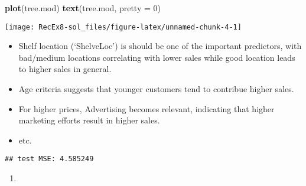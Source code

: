 \documentclass[
]{article}
\newenvironment{Shaded}{\begin{snugshade}}{\end{snugshade}}
\newcommand{\AttributeTok}[1]{\textcolor[rgb]{0.13,0.29,0.53}{#1}}
\newcommand{\DecValTok}[1]{\textcolor[rgb]{0.00,0.00,0.81}{#1}}
\newcommand{\FunctionTok}[1]{\textcolor[rgb]{0.13,0.29,0.53}{\textbf{#1}}}
\newcommand{\NormalTok}[1]{#1}
\newcommand{\OtherTok}[1]{\textcolor[rgb]{0.56,0.35,0.01}{#1}}
\newcommand{\SpecialCharTok}[1]{\textcolor[rgb]{0.81,0.36,0.00}{\textbf{#1}}}
\newcommand{\StringTok}[1]{\textcolor[rgb]{0.31,0.60,0.02}{#1}}
\providecommand{\tightlist}{%
  \setlength{\itemsep}{0pt}\setlength{\parskip}{0pt}}
\begin{document}
\begin{Shaded}
\begin{Highlighting}[]
\FunctionTok{plot}\NormalTok{(tree.mod)}
\FunctionTok{text}\NormalTok{(tree.mod, }\AttributeTok{pretty =} \DecValTok{0}\NormalTok{)}
\end{Highlighting}
\end{Shaded}

\texttt{[image: RecEx8-sol\_files/figure-latex/unnamed-chunk-4-1]}

\begin{itemize}
\tightlist
\item
  Shelf location (`ShelveLoc') is should be one of the important
  predictors, with bad/medium locations correlating with lower sales
  while good location leads to higher sales in general.
\item
  Age criteria suggests that younger customers tend to contribue higher
  sales.
\item
  For higher prices, Advertising becomes relevant, indicating that
  higher marketing efforts result in higher sales.
\item
  etc.
\end{itemize}

\begin{Shaded}
\end{Shaded}

\begin{verbatim}
## test MSE: 4.585249
\end{verbatim}

\begin{enumerate}
\def\labelenumi{\alph{enumi})}
\setcounter{enumi}{2}
\tightlist
\item
\end{enumerate}
\end{document}
